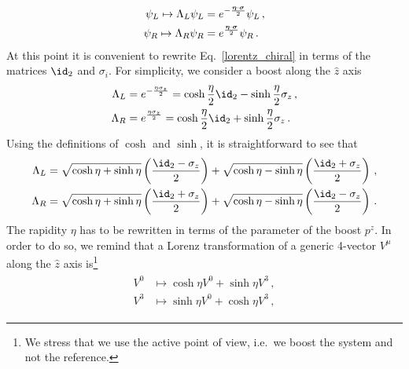 \begin{sol}
    \begin{equation}
    \label{lorentz_chiral}
    \begin{split}
        \psi_L \mapsto \Lambda_L \psi_L = &\; e^{-\frac{\boldsymbol{\eta} \cdot \boldsymbol{\sigma}}{2}} \psi_L\,,\\
        \psi_R \mapsto \Lambda_R \psi_R = &\; e^{\frac{\boldsymbol{\eta} \cdot \boldsymbol{\sigma}}{2}} \psi_R\,.
    \end{split}
    \end{equation}
    At this point it is convenient to rewrite Eq.~\eqref{lorentz_chiral} in terms of the matrices $\id_2$ and $\sigma_i$. For simplicity, we consider a boost along the $\hat{z}$ axis
       \begin{equation}
    \label{lorentz_chiral_z}
        \begin{split}
            \Lambda_L &= e^{-\frac{\eta \sigma_z}{2}} = \cosh \frac{\eta}{2} \id_2 - \sinh \frac{\eta}{2} \sigma_z\,,\\
            \Lambda_R &= e^{\frac{\eta \sigma_z}{2}} = \cosh \frac{\eta}{2} \id_2 + \sinh \frac{\eta}{2} \sigma_z\,.
        \end{split}
    \end{equation}
    Using the definitions of $\cosh$ and $\sinh$, it is straightforward to see that
    \begin{equation}
    \label{lorentz_chiral_eta}
        \begin{split}
            \Lambda_L &= \sqrt{\cosh \eta + \sinh \eta}\left( \frac{\id_2 - \sigma_z}{2} \right) + \sqrt{\cosh \eta - \sinh \eta}\left( \frac{\id_2 + \sigma_z}{2} \right)\,,\\
            \Lambda_R &= \sqrt{\cosh \eta + \sinh \eta}\left( \frac{\id_2 + \sigma_z}{2} \right) + \sqrt{\cosh \eta - \sinh \eta}\left( \frac{\id_2 - \sigma_z}{2} \right)\,.
        \end{split}
    \end{equation}
    The rapidity $\eta$ has to be rewritten in terms of the parameter of the boost $p^z$. In order to do so, we remind that a Lorenz transformation of a generic 4-vector $V^\mu$ along the $\hat{z}$ axis is\footnote{We stress that we use the active point of view, i.e.\ we boost the system and not the reference.}
    \begin{align}
        \begin{split}
            V^0 &\mapsto \cosh \eta V^0 + \sinh \eta V^3 \,,\\
            V^3 &\mapsto \sinh \eta V^0 + \cosh \eta V^3\,,
        \end{split}

\end{align}
\end{sol}

